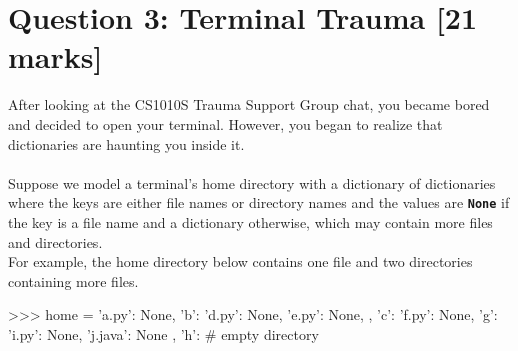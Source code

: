 \section{Question 3: Terminal Trauma [21 marks]}
After looking at the CS1010S Trauma Support Group chat, you became bored and decided to open your terminal. However, 
you began to realize that dictionaries are haunting you inside it. \\ \\
Suppose we model a terminal's home directory with a dictionary of dictionaries where the keys are either file names or directory names 
and the values are \texttt{\bfseries None} if the key is a file name and a dictionary otherwise, which may contain more files and directories. \\
For example, the home directory below contains one file and two directories containing more files.
\begin{python}
>>> home = {
        'a.py': None,
        'b': {
            'd.py': None,
            'e.py': None,
        },
        'c': {
            'f.py': None,
            'g': {
                'i.py': None,
                'j.java': None
            },
            'h': {} # empty directory
        }
    }
\end{python}
